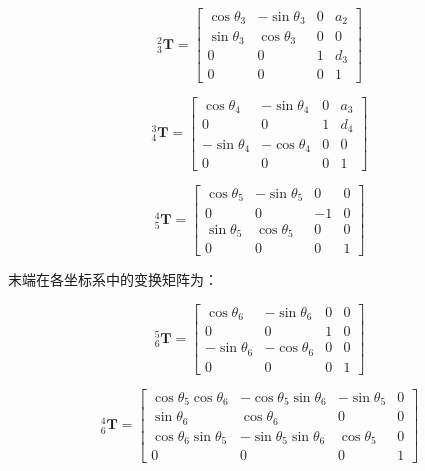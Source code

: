 \documentclass{homework}
\begin{document}
\begin{sol}
\[
  _3^2\mathbf{T} =
  \begin{bmatrix}
    \cos\theta_3 & -\sin\theta_3 & 0 & a_2 \\
    \sin\theta_3 & \cos\theta_3 & 0 & 0 \\
    0 & 0 & 1 & d_3 \\
    0 & 0 & 0 & 1
  \end{bmatrix}
\]

\[
  _4^3\mathbf{T} =
  \begin{bmatrix}
    \cos\theta_4 & -\sin\theta_4 & 0 & a_3 \\
    0 & 0 & 1 & d_4 \\
    -\sin\theta_4 & -\cos\theta_4 & 0 & 0 \\
    0 & 0 & 0 & 1
  \end{bmatrix}
\]

\[
  _5^4\mathbf{T} =
  \begin{bmatrix}
    \cos\theta_5 & -\sin\theta_5 & 0 & 0 \\
    0 & 0 & -1 & 0 \\
    \sin\theta_5 & \cos\theta_5 & 0 & 0 \\
    0 & 0 & 0 & 1
  \end{bmatrix}
\]

末端在各坐标系中的变换矩阵为：

\[
  _6^5\mathbf{T} =
  \begin{bmatrix}
    \cos\theta_6 & -\sin\theta_6 & 0 & 0 \\
    0 & 0 & 1 & 0 \\
    -\sin\theta_6 & -\cos\theta_6 & 0 & 0 \\
    0 & 0 & 0 & 1
  \end{bmatrix}
\]

\[
  _6^4\mathbf{T} =
  \begin{bmatrix}
    \cos\theta_5 \cos\theta_6 & -\cos\theta_5 \sin\theta_6 & -\sin\theta_5 & 0 \\
    \sin\theta_6 & \cos\theta_6 & 0 & 0 \\
    \cos\theta_6 \sin\theta_5 & -\sin\theta_5 \sin\theta_6 & \cos\theta_5 & 0 \\
    0 & 0 & 0 & 1
  \end{bmatrix}
\]


\end{sol}
\end{document}
